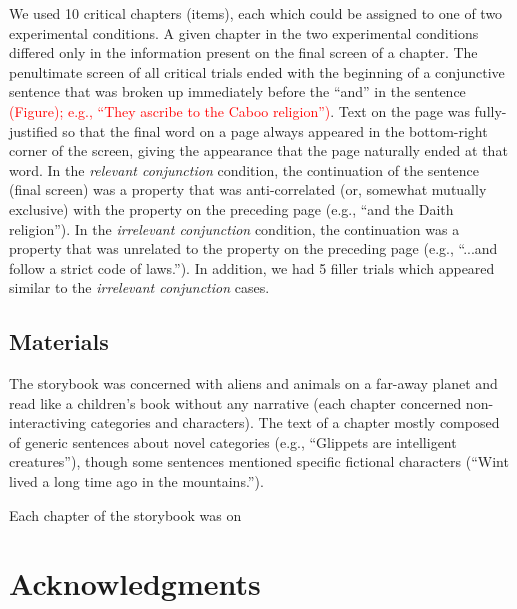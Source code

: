 \documentclass[10pt,letterpaper]{article}
\newcommand{\red}[1]{{\textcolor{Red}{#1}}}
\begin{document}
We used 10 critical chapters (items), each which could be assigned to one of two experimental conditions.
A given chapter in the two experimental conditions differed only in the information present on the final screen of a chapter.
The penultimate screen of all critical trials ended with the beginning of a conjunctive sentence that was broken up immediately before the ``and'' in the sentence \red{(Figure); e.g., ``They ascribe to the Caboo religion'')}. 
Text on the page was fully-justified so that the final word on a page always appeared in the bottom-right corner of the screen, giving the appearance that the page naturally ended at that word.
In the \emph{relevant conjunction} condition, the continuation of the sentence (final screen) was a property that was anti-correlated (or, somewhat mutually exclusive) with the property on the preceding page (e.g., ``and the Daith religion''). 
In the \emph{irrelevant conjunction} condition, the continuation was a property that was unrelated to the property on the preceding page (e.g., ``...and follow a strict code of laws.''). 
In addition, we had 5 filler trials which appeared similar to the \emph{irrelevant conjunction} cases.

\subsection{Materials}

The storybook was concerned with aliens and animals on a far-away planet and read like a children's book without any narrative (each chapter concerned non-interactiving categories and characters).
The text of a chapter mostly composed of generic sentences about novel categories (e.g., ``Glippets are intelligent creatures''), though some sentences mentioned specific fictional characters (``Wint lived a long time ago in the mountains.'').

Each chapter of the storybook was on




\section{Acknowledgments}





\setlength{\bibleftmargin}{.125in}
\setlength{\bibindent}{-\bibleftmargin}


\end{document}
